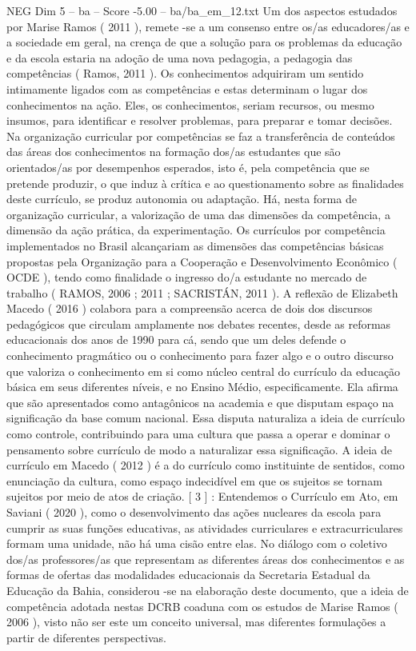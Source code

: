 \begin{textsample}{NEG Dim 5 – ba – Score -5.00 – ba/ba\_em\_12.txt}
Um dos aspectos estudados por Marise Ramos ( 2011 ), remete -se a um consenso entre os/as educadores/as e a sociedade em geral, na crença de que a solução para os problemas da educação e da escola estaria na adoção de uma nova pedagogia, a pedagogia das competências ( Ramos, 2011 ).
Os conhecimentos adquiriram um sentido intimamente ligados com as competências e estas determinam o lugar dos conhecimentos na ação.
Eles, os conhecimentos, seriam recursos, ou mesmo insumos, para identificar e resolver problemas, para preparar e tomar decisões.
Na organização curricular por competências se faz a transferência de conteúdos das áreas dos conhecimentos na formação dos/as estudantes que são orientados/as por desempenhos esperados, isto é, pela competência que se pretende produzir, o que induz à crítica e ao questionamento sobre as finalidades deste currículo, se produz autonomia ou adaptação.
Há, nesta forma de organização curricular, a valorização de uma das dimensões da competência, a dimensão da ação prática, da experimentação.
Os currículos por competência implementados no Brasil alcançariam as dimensões das competências básicas propostas pela Organização para a Cooperação e Desenvolvimento Econômico ( OCDE ), tendo como finalidade o ingresso do/a estudante no mercado de trabalho ( RAMOS, 2006 ; 2011 ; SACRISTÁN, 2011 ).
A reflexão de Elizabeth Macedo ( 2016 ) colabora para a compreensão acerca de dois dos discursos pedagógicos que circulam amplamente nos debates recentes, desde as reformas educacionais dos anos de 1990 para cá, sendo que um deles defende o conhecimento pragmático ou o conhecimento para fazer algo e o outro discurso que valoriza o conhecimento em si como núcleo central do currículo da educação básica em seus diferentes níveis, e no Ensino Médio, especificamente.
Ela afirma que são apresentados como antagônicos na academia e que disputam espaço na significação da base comum nacional.
Essa disputa naturaliza a ideia de currículo como controle, contribuindo para uma cultura que passa a operar e dominar o pensamento sobre currículo de modo a naturalizar essa significação.
A ideia de currículo em Macedo ( 2012 ) é a do currículo como instituinte de sentidos, como enunciação da cultura, como espaço indecidível em que os sujeitos se tornam sujeitos por meio de atos de criação. [ 3 ] : Entendemos o Currículo em Ato, em Saviani ( 2020 ), como o desenvolvimento das ações nucleares da escola para cumprir as suas funções educativas, as atividades curriculares e extracurriculares formam uma unidade, não há uma cisão entre elas.
No diálogo com o coletivo dos/as professores/as que representam as diferentes áreas dos conhecimentos e as formas de ofertas das modalidades educacionais da Secretaria Estadual da Educação da Bahia, considerou -se na elaboração deste documento, que a ideia de competência adotada nestas DCRB coaduna com os estudos de Marise Ramos ( 2006 ), visto não ser este um conceito universal, mas diferentes formulações a partir de diferentes perspectivas.

\end{textsample}
